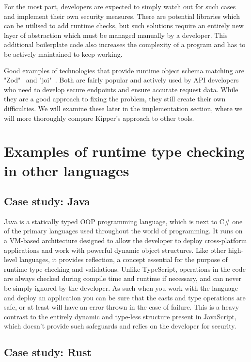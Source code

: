 For the most part, developers are expected to simply watch out for such cases and implement their own security measures. There are potential libraries which can be utilised to add runtime checks, but such solutions require an entirely new layer of abstraction which must be managed manually by a developer. This additional boilerplate code also increases the complexity of a program and has to be actively maintained to keep working.

Good examples of technologies that provide runtime object schema matching are "Zod"~\cite{zod} and "joi"~\cite{joi}. Both are fairly popular and actively used by API developers who need to develop secure endpoints and ensure accurate request data. While they are a good approach to fixing the problem, they still create their own difficulties. We will examine these later in the implementation section, where we will more thoroughly compare Kipper's approach to other tools.

\section{Examples of runtime type checking in other languages}

\subsection{Case study: Java}

Java is a statically typed OOP programming language, which is next to C\# one of the primary languages used throughout the world of programming. It runs on a VM-based architecture designed to allow the developer to deploy cross-platform applications and work with powerful dynamic object structures. Like other high-level languages, it provides reflection, a concept essential for the purpose of runtime type checking and validations. Unlike TypeScript, operations in the code are always checked during compile time and runtime if necessary, and can never be simply ignored by the developer. As such when you work with the language and deploy an application you can be sure that the casts and type operations are safe, or at least will have an error thrown in the case of failure. This is a heavy contrast to the entirely dynamic and type-less structure present in JavaScript, which doesn't provide such safeguards and relies on the developer for security.

\subsection{Case study: Rust}

